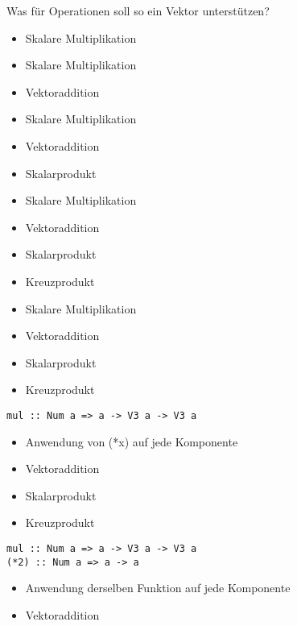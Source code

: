 \documentclass{beamer}
\begin{document}
\begin{frame}[fragile]
Was für Operationen soll so ein Vektor unterstützen?
\pause
\begin{overprint}
\begin{itemize}
 \item Skalare Multiplikation
\end{itemize}
\begin{itemize}
 \item Skalare Multiplikation
 \item Vektoraddition
\end{itemize}
\begin{itemize}
 \item Skalare Multiplikation
 \item Vektoraddition
 \item Skalarprodukt
\end{itemize}
\begin{itemize}
 \item Skalare Multiplikation
 \item Vektoraddition
 \item Skalarprodukt
 \item Kreuzprodukt
\end{itemize}
\begin{itemize}
 \item Skalare Multiplikation
 \item Vektoraddition
 \item Skalarprodukt
 \item Kreuzprodukt
\end{itemize}
\begin{verbatim}
mul :: Num a => a -> V3 a -> V3 a
\end{verbatim}
\begin{itemize}
 \item Anwendung von (*x) auf jede Komponente
 \item Vektoraddition
 \item Skalarprodukt
 \item Kreuzprodukt
\end{itemize}
\begin{verbatim}
mul :: Num a => a -> V3 a -> V3 a
(*2) :: Num a => a -> a
\end{verbatim}
\begin{itemize}
 \item Anwendung derselben Funktion auf jede Komponente
 \item Vektoraddition

\end{itemize}
\end{overprint}
\end{frame}
\end{document}
